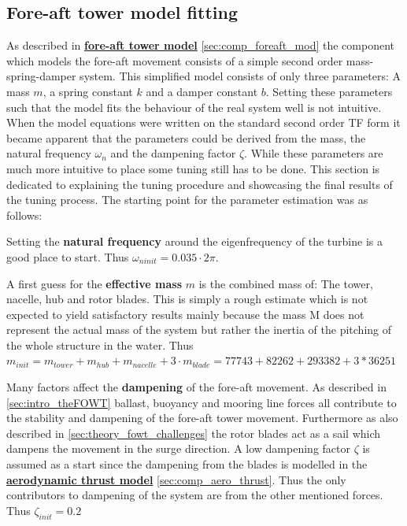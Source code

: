 


\subsection{Fore-aft tower model fitting} \label{sec:app_mod_foreaft_fitting}
As described in \hyperref[sec:comp_foreaft_mod]{\textbf{fore-aft tower model}} \cref{sec:comp_foreaft_mod} the component which models the fore-aft movement consists of a simple second order mass-spring-damper system. This simplified model consists of only three parameters: A mass $ m $, a spring constant $ k $ and a damper constant $ b $. Setting these parameters such that the model fits the behaviour of the real system well is not intuitive. When the model equations were written on the standard second order TF form it became apparent that the parameters could be derived from the mass, the natural frequency $ \omega_n $ and the dampening factor $ \zeta $. While these parameters are much more intuitive to place some tuning still has to be done. This section is dedicated to explaining the tuning procedure and showcasing the final results of the tuning process. The starting point for the parameter estimation was as follows:

\smallskip
\noindent Setting the \textbf{natural frequency} around the eigenfrequency of the turbine is a good place to start. Thus $ \omega_{ninit} = 0.035 \cdot 2 \pi $.

\smallskip
\noindent A first guess for the \textbf{effective mass} $ m $ is the combined mass of: The tower, nacelle, hub and rotor blades. This is simply a rough estimate which is not expected to yield satisfactory results mainly because the mass M does not represent the actual mass of the system but rather the inertia of the pitching of the whole structure in the water. Thus $ m_{init} = m_{tower} + m_{hub} + m_{nacelle} + 3 \cdot m_{blade} = 77743 + 82262 + 293382 + 3*36251 $

\smallskip
\noindent Many factors affect the \textbf{dampening} of the fore-aft movement. As described in \cref{sec:intro_theFOWT} ballast, buoyancy and mooring line forces all contribute to the stability and dampening of the fore-aft tower movement. Furthermore as also described in \cref{sec:theory_fowt_challenges} the rotor blades act as a sail which dampens the movement in the surge direction. A low dampening factor $ \zeta $ is assumed as a start since the dampening from the blades is modelled in the \hyperref[sec:comp_aero_thrust]{\textbf{aerodynamic thrust model}} \cref{sec:comp_aero_thrust}. Thus the only contributors to dampening of the system are from the other mentioned forces. Thus $ \zeta_{init} = 0.2 $

